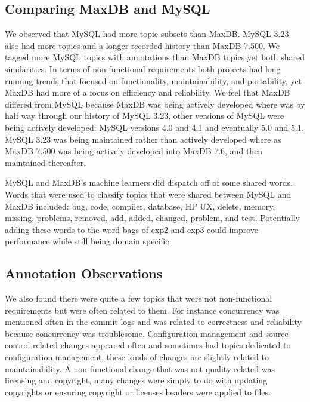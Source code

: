 \documentclass{acm_proc_article-sp}
\newcommand{\XXX}[1]{\textcolor{red}{{\it \textbf{[XXX: #1]}}}}
\begin{document}
\subsection{Comparing MaxDB and MySQL}


We observed that MySQL had more topic subsets than MaxDB. MySQL 3.23 also had more topics and a longer recorded history than MaxDB 7.500. We tagged more MySQL topics with annotations than MaxDB topics yet both shared similarities. In terms of non-functional requirements both projects had long running trends that focused on functionality, maintainability, and portability, yet MaxDB had more of a focus on efficiency and reliability. We feel that MaxDB differed from MySQL because MaxDB was being actively developed where was by half way through our history of MySQL 3.23, other versions of MySQL were being actively developed: MySQL versions 4.0 and 4.1 and eventually 5.0 and 5.1. MySQL 3.23 was being maintained rather than actively developed where as MaxDB 7.500 was being actively developed into MaxDB 7.6, and then maintained thereafter.

MySQL and MaxDB's machine learners did dispatch off of some shared words. Words that were used to classify topics that were shared between MySQL and MaxDB included: bug, code, compiler, database, HP UX, delete, memory, missing, problems, removed, add, added, changed, problem, and test. Potentially adding these words to the word bags of \textsf{exp2} and \textsf{exp3} could improve performance while still being domain specific.

\subsection{Annotation Observations}

We also found there were quite a few topics that were not non-functional requirements but were often related to them. For instance concurrency was mentioned often in the commit logs and was related to correctness and reliability because concurrency was troublesome. Configuration management and source control related changes appeared often and sometimes had topics dedicated to configuration management, these kinds of changes are slightly related to maintainability. A non-functional change that was not quality related was licensing and copyright, many changes were simply to do with updating copyrights or ensuring copyright or licenses headers were applied to files.
\end{document}
